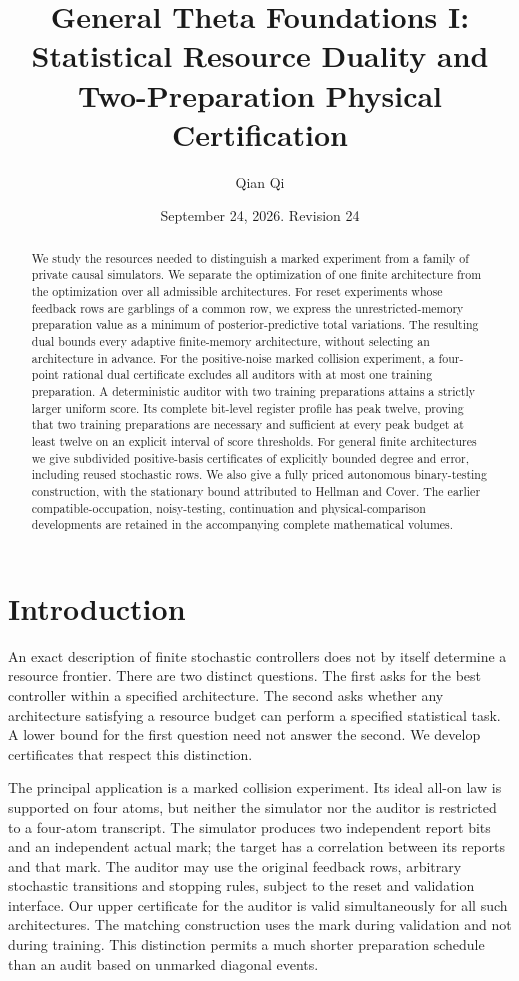 \documentclass[11pt]{amsart}
\title[Statistical resource duality]{General Theta Foundations I:\\
Statistical Resource Duality and Two-Preparation Physical Certification}
\author{Qian Qi}
\date{September 24, 2026. Revision 24}
\theoremstyle{definition}\newtheorem{definition}[theorem]{Definition}
\theoremstyle{remark}\newtheorem{remark}[theorem]{Remark}
\newcommand{\1}{\mathbf 1}
\begin{document}
\begin{abstract}
We study the resources needed to distinguish a marked experiment from a
family of private causal simulators. We separate the optimization of one
finite architecture from the optimization over all admissible architectures.
For reset experiments whose feedback rows are garblings of a common row,
we express the unrestricted-memory preparation value as a minimum of
posterior-predictive total variations. The resulting dual bounds every
adaptive finite-memory architecture, without selecting an architecture in
advance. For the positive-noise marked collision experiment, a four-point
rational dual certificate excludes all auditors with at most one training
preparation. A deterministic auditor with two training preparations attains
a strictly larger uniform score. Its complete bit-level register profile
has peak twelve, proving that two training preparations are necessary and
sufficient at every peak budget at least twelve on an explicit interval of
score thresholds. For general finite architectures we give subdivided
positive-basis certificates of explicitly bounded degree and error,
including reused stochastic rows. We also give a fully priced autonomous
binary-testing construction, with the stationary bound attributed to
Hellman and Cover. The earlier compatible-occupation, noisy-testing,
continuation and physical-comparison developments are retained in the
accompanying complete mathematical volumes.
\end{abstract}
\maketitle
\tableofcontents

\section{Introduction}
An exact description of finite stochastic controllers does not by itself
determine a resource frontier. There are two distinct questions. The first
asks for the best controller within a specified architecture. The second
asks whether any architecture satisfying a resource budget can perform a
specified statistical task. A lower bound for the first question need not
answer the second. We develop certificates that respect this distinction.

The principal application is a marked collision experiment. Its ideal
all-on law is supported on four atoms, but neither the simulator nor the
auditor is restricted to a four-atom transcript. The simulator produces two
independent report bits and an independent actual mark; the target has a
correlation between its reports and that mark. The auditor may use the
original feedback rows, arbitrary stochastic transitions and stopping
rules, subject to the reset and validation interface. Our upper certificate
for the auditor is valid simultaneously for all such architectures. The
matching construction uses the mark during validation and not during
training. This distinction permits a much shorter preparation schedule
than an audit based on unmarked diagonal events.
\end{document}
